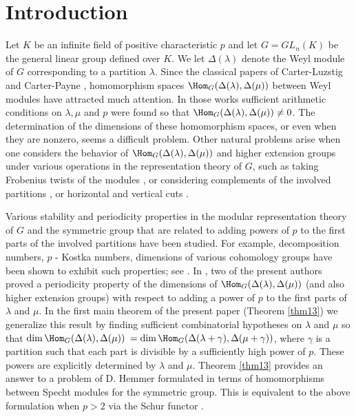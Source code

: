 \section{Introduction} Let $K$ be an infinite field of positive characteristic $p$ and let $G=GL_n(K)$ be the general linear group defined over $K$. We let $\Delta({\lambda})$ denote the Weyl module of $G$ corresponding to a partition $\lambda$. Since the classical papers of Carter-Luzstig \cite{CL} and Carter-Payne \cite{CP}, homomorphism spaces $\Hom_G(\Delta(\lambda), \Delta(\mu))$ between Weyl modules have attracted much attention. In those works sufficient arithmetic conditions on $\lambda, \mu$ and $p$ were found so that $\Hom_G(\Delta(\lambda), \Delta(\mu)) \neq 0$. The determination of the dimensions of these homomorphism spaces, or even when they are nonzero, seems a difficult problem. Other natural problems arise when one considers the behavior of $\Hom_G(\Delta(\lambda), \Delta(\mu))$ and higher extension groups under various operations in the representation theory of $G$, such as taking Frobenius twists of the modules \cite{CPSK}, or considering complements of the involved partitions \cite{FHKD}, or horizontal and vertical cuts \cite{FL, D, BG}.  

Various stability and periodicity properties in the modular representation theory of $G$ and the symmetric group that are related to adding powers of $p$ to the first parts of the involved partitions have  been studied. For example, decomposition numbers, $p$ - Kostka numbers, dimensions of various cohomology groups have been shown to exhibit such properties; see \cite{Gi, Ha, HK, Hen, NS}. In \cite[Theorem 1.1(1)]{MS4}, two of the present authors proved a periodicity property of the dimensions of $\Hom_G(\Delta(\lambda), \Delta(\mu))$ (and also higher extension groups) with respect to adding a power of $p$ to the first parts of $\lambda$ and $\mu$. In the first main theorem of the present paper (Theorem \ref{thm13})  we generalize this result by finding sufficient combinatorial hypotheses on $\lambda$ and $\mu$ so that $\dim\Hom_G(\Delta(\lambda), \Delta(\mu)) $ $=\dim\Hom_G(\Delta(\lambda +\gamma),\Delta(\mu + \gamma))$, where $\gamma$ is a partition such that each part is divisible by a  sufficiently high power of $p$. These powers are explicitly determined by $\lambda$ and $\mu$. Theorem \ref{thm13} provides an answer to a problem  of D. Hemmer \cite[Problem 5.4]{Hem2} formulated in terms of homomorphisms between Specht modules for the symmetric group. This is equivalent to the above formulation when $p>2$ via the Schur functor \cite{Gr}. 

